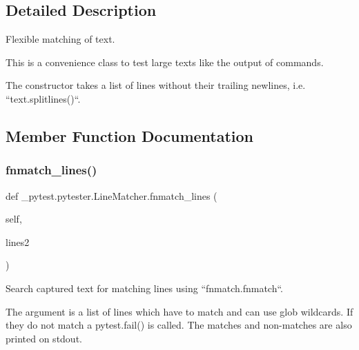 \subsection{Detailed Description}
\begin{DoxyVerb}Flexible matching of text.

This is a convenience class to test large texts like the output of
commands.

The constructor takes a list of lines without their trailing newlines, i.e.
``text.splitlines()``.\end{DoxyVerb}
 

\subsection{Member Function Documentation}
\mbox{\label{class__pytest_1_1pytester_1_1_line_matcher_a114cc37c53d37f961df9f9bf4341d381}} 
\subsubsection{\texorpdfstring{fnmatch\+\_\+lines()}{fnmatch\_lines()}}
{\footnotesize\ttfamily def \+\_\+pytest.\+pytester.\+Line\+Matcher.\+fnmatch\+\_\+lines (\begin{DoxyParamCaption}\item[{}]{self,  }\item[{}]{lines2 }\end{DoxyParamCaption})}

\begin{DoxyVerb}Search captured text for matching lines using ``fnmatch.fnmatch``.

The argument is a list of lines which have to match and can use glob
wildcards.  If they do not match a pytest.fail() is called.  The
matches and non-matches are also printed on stdout.\end{DoxyVerb}
 \mbox{\label{class__pytest_1_1pytester_1_1_line_matcher_a77606dd9fd900b4863c766c5f640ba27}} 

